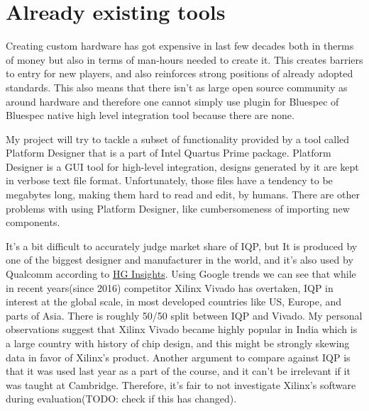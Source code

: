 \documentclass[14pt]{report}
\begin{document}
\section{Already existing tools}
Creating custom hardware has got expensive in last few decades both in therms of money but also in terms of man-hours needed to create it. 
This creates barriers to entry for new players, and also reinforces strong positions of already adopted standards. 
This also means that there isn't as large open source community as around hardware and therefore one cannot simply use plugin for Bluespec of Bluespec native high level integration tool because there are none.

My project will try to tackle a subset of functionality provided by a tool called Platform Designer that is a part of Intel Quartus Prime package. Platform Designer is a GUI tool for high-level integration, designs generated by it are kept in verbose text file format. Unfortunately, those files have a tendency to be megabytes long, making them hard to read and edit, by humans. There are other problems with using Platform Designer, like cumbersomeness of importing new components.

\begin{tcolorbox}[title=Market share and justification for focusing entirely on comparisons with Intel Quartus Prime]
    It's a bit difficult to accurately judge market share of IQP, but It is produced by one of the biggest designer and manufacturer in the world, and it's also used by Qualcomm according to \href{https://discovery.hgdata.com/product/intel-quartus-prime}{HG Insights}. Using Google trends we can see that while in recent years(since 2016) competitor Xilinx Vivado has overtaken, IQP in interest at the global scale, in most developed countries like US, Europe, and parts of Asia. There is roughly 50/50 split between IQP and Vivado. My personal observations suggest that Xilinx Vivado became highly popular in India which is a large country with history of chip design, and this might be strongly skewing data in favor of Xilinx's product. Another argument to compare against IQP is that it was used last year as a part of the course, and it can't be irrelevant if it was taught at Cambridge. Therefore, it's fair to not investigate Xilinx's software during evaluation(TODO: check if this has changed).
\end{tcolorbox}
\end{document}
